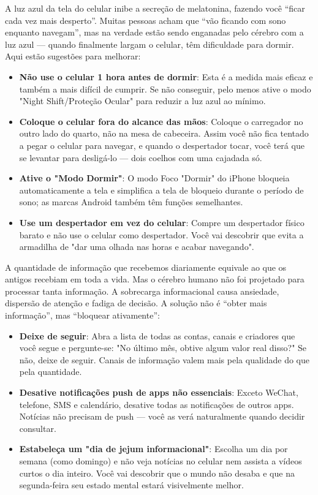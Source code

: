 A luz azul da tela do celular inibe a secreção de melatonina, fazendo você “ficar cada vez mais desperto”. Muitas pessoas acham que “vão ficando com sono enquanto navegam”, mas na verdade estão sendo enganadas pelo cérebro com a luz azul — quando finalmente largam o celular, têm dificuldade para dormir. Aqui estão sugestões para melhorar:

\begin{itemize}
  \item \textbf{Não use o celular 1 hora antes de dormir}: Esta é a medida mais eficaz e também a mais difícil de cumprir. Se não conseguir, pelo menos ative o modo "Night Shift/Proteção Ocular" para reduzir a luz azul ao mínimo.
  \item \textbf{Coloque o celular fora do alcance das mãos}: Coloque o carregador no outro lado do quarto, não na mesa de cabeceira. Assim você não fica tentado a pegar o celular para navegar, e quando o despertador tocar, você terá que se levantar para desligá-lo — dois coelhos com uma cajadada só.
  \item \textbf{Ative o "Modo Dormir"}: O modo Foco "Dormir" do iPhone bloqueia automaticamente a tela e simplifica a tela de bloqueio durante o período de sono; as marcas Android também têm funções semelhantes.
  \item \textbf{Use um despertador em vez do celular}: Compre um despertador físico barato e não use o celular como despertador. Você vai descobrir que evita a armadilha de "dar uma olhada nas horas e acabar navegando".
\end{itemize}


A quantidade de informação que recebemos diariamente equivale ao que os antigos recebiam em toda a vida. Mas o cérebro humano não foi projetado para processar tanta informação. A sobrecarga informacional causa ansiedade, dispersão de atenção e fadiga de decisão. A solução não é “obter mais informação”, mas “bloquear ativamente”:

\begin{itemize}
  \item \textbf{Deixe de seguir}: Abra a lista de todas as contas, canais e criadores que você segue e pergunte-se: "No último mês, obtive algum valor real disso?" Se não, deixe de seguir. Canais de informação valem mais pela qualidade do que pela quantidade.
  \item \textbf{Desative notificações push de apps não essenciais}: Exceto WeChat, telefone, SMS e calendário, desative todas as notificações de outros apps. Notícias não precisam de push — você as verá naturalmente quando decidir consultar.
  \item \textbf{Estabeleça um "dia de jejum informacional"}: Escolha um dia por semana (como domingo) e não veja notícias no celular nem assista a vídeos curtos o dia inteiro. Você vai descobrir que o mundo não desaba e que na segunda-feira seu estado mental estará visivelmente melhor.
\end{itemize}

